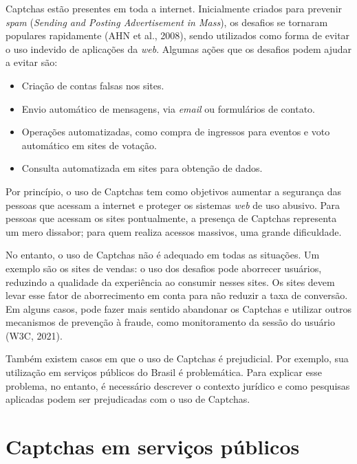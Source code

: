 \documentclass[12pt,twoside,brazilian]{book}
\providecommand{\tightlist}{%
  \setlength{\itemsep}{0pt}\setlength{\parskip}{0pt}}
\begin{document}
Captchas estão presentes em toda a internet. Inicialmente criados para
prevenir \emph{spam} (\emph{Sending and Posting Advertisement in Mass}),
os desafios se tornaram populares rapidamente (AHN et al., 2008), sendo
utilizados como forma de evitar o uso indevido de aplicações da
\emph{web}. Algumas ações que os desafios podem ajudar a evitar são:

\begin{itemize}
\tightlist
\item
  Criação de contas falsas nos sites.
\item
  Envio automático de mensagens, via \emph{email} ou formulários de
  contato.
\item
  Operações automatizadas, como compra de ingressos para eventos e voto
  automático em sites de votação.
\item
  Consulta automatizada em sites para obtenção de dados.
\end{itemize}

Por princípio, o uso de Captchas tem como objetivos aumentar a segurança
das pessoas que acessam a internet e proteger os sistemas \emph{web} de
uso abusivo. Para pessoas que acessam os sites pontualmente, a presença
de Captchas representa um mero dissabor; para quem realiza acessos
massivos, uma grande dificuldade.

No entanto, o uso de Captchas não é adequado em todas as situações. Um
exemplo são os sites de vendas: o uso dos desafios pode aborrecer
usuários, reduzindo a qualidade da experiência ao consumir nesses sites.
Os sites devem levar esse fator de aborrecimento em conta para não
reduzir a taxa de conversão. Em alguns casos, pode fazer mais sentido
abandonar os Captchas e utilizar outros mecanismos de prevenção à
fraude, como monitoramento da sessão do usuário (W3C, 2021).

Também existem casos em que o uso de Captchas é prejudicial. Por
exemplo, sua utilização em serviços públicos do Brasil é problemática.
Para explicar esse problema, no entanto, é necessário descrever o
contexto jurídico e como pesquisas aplicadas podem ser prejudicadas com
o uso de Captchas.

\hypertarget{sec-captchas-publicos}{%
\section{Captchas em serviços públicos}\label{sec-captchas-publicos}}
\end{document}
